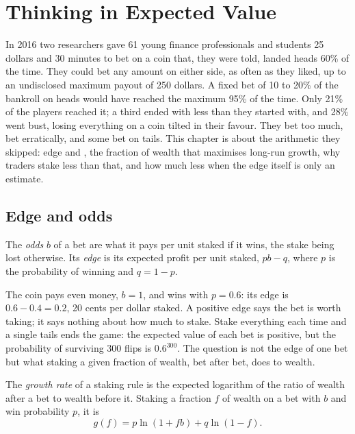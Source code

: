 \chapter{Thinking in Expected Value}\label{ch:m2:thinking-in-expected-value}

In 2016 two researchers gave 61 young finance professionals and students 25 dollars
and 30 minutes to bet on a coin that, they were told, landed heads 60\% of the time. They
could bet any amount on either side, as often as they liked, up to an undisclosed
maximum payout of 250 dollars. A fixed bet of 10 to 20\% of the bankroll on heads would
have reached the maximum 95\% of the time. Only 21\% of the players reached it; a third
ended with less than they started with, and 28\% went bust, losing everything on a coin
tilted in their favour. They bet too much, bet erratically, and some bet on tails. This
chapter is about the arithmetic they skipped: edge and , the fraction of wealth that
maximises long-run growth, why traders stake less than that, and how much less when the
edge itself is only an estimate.

\section{Edge and odds}

\begin{definition}\label{def:m2:thinking-in-expected-value:edge}
The \emph{odds} $b$ of a bet are what it pays per unit staked if it wins,
the stake being lost otherwise. Its \emph{edge} is its expected profit per
unit staked, $pb - q$, where $p$ is the probability of winning and $q = 1 - p$.
\end{definition}

The coin pays even money, $b = 1$, and wins with $p = 0.6$: its edge is $0.6 - 0.4 = 0.2$,
20 cents per dollar staked. A positive edge says the bet is worth taking; it says nothing
about how much to stake. Stake everything each time and a single tails ends the game:
the expected value of each bet is positive, but the probability of surviving 300 flips
is $0.6^{300}$. The question is not the edge of one bet but what staking a given fraction
of wealth, bet after bet, does to wealth.

\begin{definition}\label{def:m2:thinking-in-expected-value:growth}
The \emph{growth rate} of a staking rule is the expected logarithm of
the ratio of wealth after a bet to wealth before it. Staking a fraction $f$ of wealth on
a bet with  $b$ and win probability $p$, it is
\[
g(f) = p\ln(1 + fb) + q\ln(1 - f).
\]
\end{definition}


